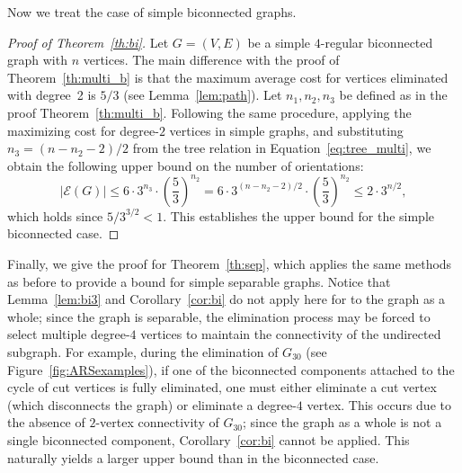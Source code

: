 \documentclass{article}
\begin{document}
        Now we treat the case of simple biconnected graphs.

        \begin{proof}[Proof of Theorem~\ref{th:bi}]
            Let $G=(V,E)$ be a simple $4$-regular biconnected graph with $n$ vertices.
            The main difference with the proof of Theorem~\ref{th:multi_b} is that the maximum average cost for vertices eliminated with degree~2 is $5/3$ (see Lemma~\ref{lem:path}).
            Let $n_1, n_2, n_3$ be defined as in the proof Theorem~\ref{th:multi_b}.
            Following the same procedure, applying the maximizing cost for degree-$2$ vertices in simple graphs, and substituting $n_3 = (n-n_2-2)/2$ from the tree relation in Equation~\eqref{eq:tree_multi}, we obtain the following upper bound on the number of orientations:
            $$ |\mathcal{E}(G)| \leq 6\cdot 3^{n_3} \cdot \left(\frac{5}{3} \right)^{n_2}= 6\cdot 3^{(n-n_2-2)/2}\cdot \left(\frac{5}{3}\right)^{n_2} \leq 2\cdot 3^{n/2}, $$
            which holds since $5/3^{3/2} < 1$.
            This establishes the upper bound for the simple biconnected case.
        \end{proof}

        Finally, we give the proof for Theorem~\ref{th:sep}, which applies the same methods as before to provide a bound for simple separable graphs.
        Notice that Lemma~\ref{lem:bi3} and Corollary~\ref{cor:bi} do not apply here for to the graph as a whole; since the graph is separable, the elimination process may be forced to select multiple degree-$4$ vertices to maintain the connectivity of the undirected subgraph.
        For example, during the elimination of $G_{30}$ (see Figure~\ref{fig:ARSexamples}), if one of the biconnected components attached to the cycle of cut vertices is fully eliminated, one must either eliminate a cut vertex (which disconnects the graph) or eliminate a degree-$4$ vertex.
        This occurs due to the absence of $2$-vertex connectivity of $G_{30}$; since the graph as a whole is not a single biconnected component, Corollary~\ref{cor:bi} cannot be applied.
        This naturally yields a larger upper bound than in the biconnected case.
\end{document}
